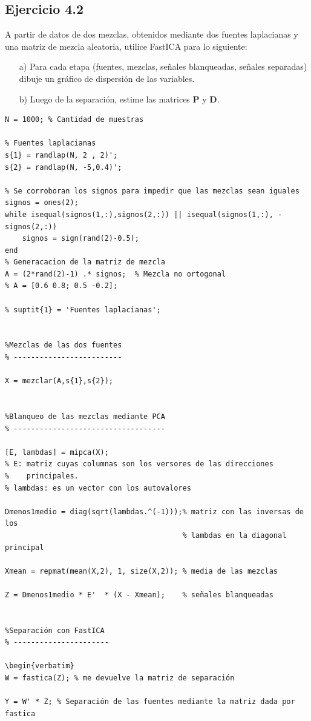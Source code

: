 \documentclass[11pt,a4paper,final]{article}
\begin{document}
\subsection{Ejercicio 4.2}

A partir de datos de dos mezclas, obtenidos mediante dos fuentes laplacianas y una matriz de mezcla aleatoria, utilice FastICA para lo siguiente:

\begin{enumerate}
   \item[a)] Para cada etapa (fuentes, mezclas, señales blanqueadas, señales   separadas) dibuje un gráfico de dispersión de las variables.
   \item[b)] Luego de la separación, estime las matrices $\mathbf{P}$ y $\mathbf{D}$.
\end{enumerate}
\begin{verbatim}
N = 1000; % Cantidad de muestras

% Fuentes laplacianas
s{1} = randlap(N, 2 , 2)';
s{2} = randlap(N, -5,0.4)';

% Se corroboran los signos para impedir que las mezclas sean iguales
signos = ones(2);
while isequal(signos(1,:),signos(2,:)) || isequal(signos(1,:), -signos(2,:))
    signos = sign(rand(2)-0.5);
end
% Generacacion de la matriz de mezcla
A = (2*rand(2)-1) .* signos;  % Mezcla no ortogonal
% A = [0.6 0.8; 0.5 -0.2];

% suptit{1} = 'Fuentes laplacianas';


%Mezclas de las dos fuentes
% -------------------------

X = mezclar(A,s{1},s{2});


%Blanqueo de las mezclas mediante PCA
% -----------------------------------

[E, lambdas] = mipca(X);
% E: matriz cuyas columnas son los versores de las direcciones
%    principales.
% lambdas: es un vector con los autovalores

Dmenos1medio = diag(sqrt(lambdas.^(-1)));% matriz con las inversas de los
                                         % lambdas en la diagonal principal

Xmean = repmat(mean(X,2), 1, size(X,2)); % media de las mezclas

Z = Dmenos1medio * E'  * (X - Xmean);    % señales blanqueadas


%Separación con FastICA
% ----------------------

\begin{verbatim}
W = fastica(Z); % me devuelve la matriz de separación

Y = W' * Z; % Separación de las fuentes mediante la matriz dada por fastica
\end{verbatim}
\end{document}
